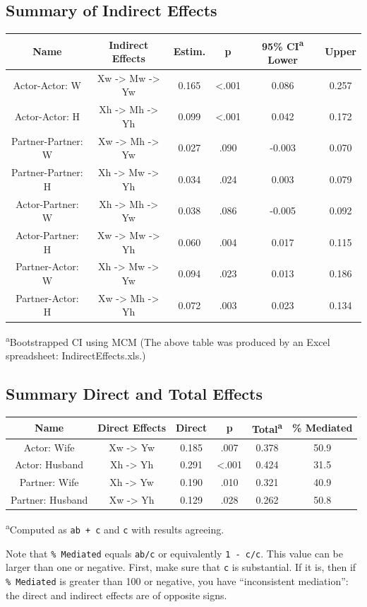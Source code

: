 \documentclass[
  english,
  man,floatsintext]{apa6}
\begin{document}
\hypertarget{summary-of-indirect-effects}{%
\subsection{Summary of Indirect Effects}\label{summary-of-indirect-effects}}

\begin{longtable}[]{@{}cccccc@{}}
\toprule
Name & Indirect Effects & Estim. & p & 95\% CI\textsuperscript{a} Lower & Upper\tabularnewline
\midrule
\endhead
Actor-Actor: W & Xw -\textgreater{} Mw -\textgreater{} Yw & 0.165 & \textless.001 & 0.086 & 0.257\tabularnewline
Actor-Actor: H & Xh -\textgreater{} Mh -\textgreater{} Yh & 0.099 & \textless.001 & 0.042 & 0.172\tabularnewline
Partner-Partner: W & Xw -\textgreater{} Mh -\textgreater{} Yw & 0.027 & .090 & -0.003 & 0.070\tabularnewline
Partner-Partner: H & Xh -\textgreater{} Mw -\textgreater{} Yh & 0.034 & .024 & 0.003 & 0.079\tabularnewline
Actor-Partner: W & Xh -\textgreater{} Mh -\textgreater{} Yw & 0.038 & .086 & -0.005 & 0.092\tabularnewline
Actor-Partner: H & Xw -\textgreater{} Mw -\textgreater{} Yh & 0.060 & .004 & 0.017 & 0.115\tabularnewline
Partner-Actor: W & Xh -\textgreater{} Mw -\textgreater{} Yw & 0.094 & .023 & 0.013 & 0.186\tabularnewline
Partner-Actor: H & Xw -\textgreater{} Mh -\textgreater{} Yh & 0.072 & .003 & 0.023 & 0.134\tabularnewline
\bottomrule
\end{longtable}

\textsuperscript{a}Bootstrapped CI using MCM
(The above table was produced by an Excel spreadsheet: IndirectEffects.xls.)

\hypertarget{summary-direct-and-total-effects}{%
\subsection{Summary Direct and Total Effects}\label{summary-direct-and-total-effects}}

\begin{longtable}[]{@{}cccccc@{}}
\toprule
Name & Direct Effects & Direct & p & Total\textsuperscript{a} & \% Mediated\tabularnewline
\midrule
\endhead
Actor: Wife & Xw -\textgreater{} Yw & 0.185 & .007 & 0.378 & 50.9\tabularnewline
Actor: Husband & Xh -\textgreater{} Yh & 0.291 & \textless.001 & 0.424 & 31.5\tabularnewline
Partner: Wife & Xh -\textgreater{} Yw & 0.190 & .010 & 0.321 & 40.9\tabularnewline
Partner: Husband & Xw -\textgreater{} Yh & 0.129 & .028 & 0.262 & 50.8\tabularnewline
\bottomrule
\end{longtable}

\textsuperscript{a}Computed as \texttt{ab\ +\ c\textquotesingle{}} and \texttt{c} with results agreeing.

Note that \texttt{\%\ Mediated} equals \texttt{ab/c} or equivalently \texttt{1\ -\ c\textquotesingle{}/c}. This value can be larger than one or negative. First, make sure that \texttt{c} is substantial. If it is, then if \texttt{\%\ Mediated} is greater than 100 or negative, you have \enquote{inconsistent mediation}: the direct and indirect effects are of opposite signs.


\clearpage
\renewcommand{\listfigurename}{Figure captions}

\clearpage
\renewcommand{\listtablename}{Table captions}
\end{document}
